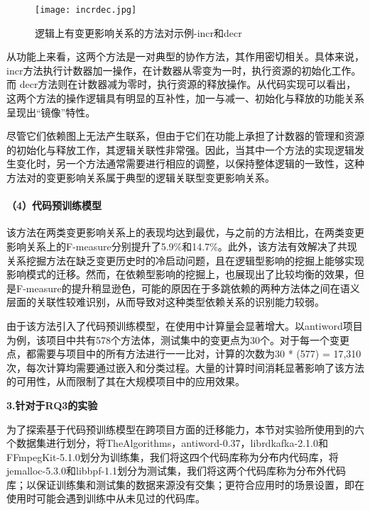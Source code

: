 \begin{figure}[h]
\centering
\texttt{[image: incrdec.jpg]}
\caption{逻辑上有变更影响关系的方法对示例-incr和decr}
\label{1_逻辑上有变更影响关系的方法对示例-incr和decr}
\end{figure}

从功能上来看，这两个方法是一对典型的协作方法，其作用密切相关。具体来说，incr方法执行计数器加一操作，在计数器从零变为一时，执行资源的初始化工作。而 decr方法则在计数器减为零时，执行资源的释放操作。从代码实现可以看出，这两个方法的操作逻辑具有明显的互补性，加一与减一、初始化与释放的功能关系呈现出“镜像”特性。

尽管它们依赖图上无法产生联系，但由于它们在功能上承担了计数器的管理和资源的初始化与释放工作，其逻辑关联性非常强。因此，当其中一个方法的实现逻辑发生变化时，另一个方法通常需要进行相应的调整，以保持整体逻辑的一致性，这种方法对的变更影响关系属于典型的逻辑关联型变更影响关系。

\paragraph{（4）代码预训练模型}

该方法在两类变更影响关系上的表现均达到最优，与之前的方法相比，在两类变更影响关系上的F-measure分别提升了5.9\%和14.7\%。此外，该方法有效解决了共现关系挖掘方法在缺乏变更历史时的冷启动问题，且在逻辑型影响的挖掘上能够实现影响模式的迁移。然而，在依赖型影响的挖掘上，也展现出了比较均衡的效果，但是F-measure的提升稍显逊色，可能的原因在于多跳依赖的两种方法体之间在语义层面的关联性较难识别，从而导致对这种类型依赖关系的识别能力较弱。

由于该方法引入了代码预训练模型，在使用中计算量会显著增大。以antiword项目为例，该项目中共有578个方法体，测试集中的变更点为30个。对于每一个变更点，都需要与项目中的所有方法进行一一比对，计算的次数为30 * (577) = 17,310次，每次计算均需要通过嵌入和分类过程。大量的计算时间消耗显著影响了该方法的可用性，从而限制了其在大规模项目中的应用效果。
    

\textbf{3.针对于RQ3的实验}

为了探索基于代码预训练模型在跨项目方面的迁移能力，本节对实验所使用到的六个数据集进行划分，将TheAlgorithms，antiword-0.37，librdkafka-2.1.0和FFmpegKit-5.1.0划分为训练集，我们将这四个代码库称为分布内代码库，将jemalloc-5.3.0和libbpf-1.1划分为测试集，我们将这两个代码库称为分布外代码库；以保证训练集和测试集的数据来源没有交集；更符合应用时的场景设置，即在使用时可能会遇到训练中从未见过的代码库。


